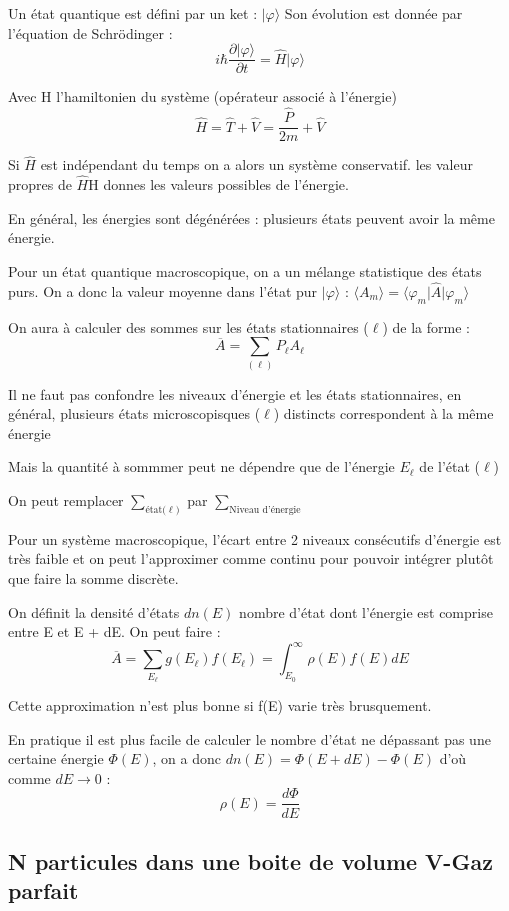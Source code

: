 \documentclass[12pt,a4paper]{report}
\begin{document}
Un état quantique est défini par un ket : \(\vert \varphi \rangle\)
Son évolution est donnée par l'équation de Schrödinger :
\[
	i\hbar \dfrac{\partial \vert \varphi \rangle}{\partial t} = \hat{H} \vert \varphi \rangle
\]

Avec H l'hamiltonien du système (opérateur associé à l'énergie)
\[
	\hat{H} = \hat{T} + \hat{V} = \dfrac{\hat{P}}{2m} + \hat{V}
\]

Si \(\hat{H}\) est indépendant du temps on a alors un système conservatif. les valeur propres de \(\hat{H}\)H donnes les valeurs possibles de l'énergie.

En général, les énergies sont dégénérées : plusieurs états peuvent avoir la même énergie.

Pour un état quantique macroscopique, on a un mélange statistique des états purs.
On a donc la valeur moyenne dans l'état pur \(\vert \varphi \rangle\) : \(\langle A_m \rangle = \langle \varphi_m \vert \hat{A} \vert \varphi_m \rangle\)

On aura à calculer des sommes sur les états stationnaires (\(\ell\)) de la forme :
\[
	\overline{A} = \sum_{(\ell)} P_{\ell} A_{\ell}
\]

Il ne faut pas confondre les niveaux d'énergie et les états stationnaires, en général, plusieurs états microscopisques (\(\ell\)) distincts correspondent à la même énergie

Mais la quantité à sommmer peut ne dépendre que de l'énergie \(E_\ell\) de l'état (\(\ell\))

On peut remplacer \(\sum_{\text{état(}\ell)}\) par \(\sum_{\text{Niveau d'énergie}}\)

Pour un système macroscopique, l'écart entre 2 niveaux consécutifs d'énergie est très faible et on peut l'approximer comme continu pour pouvoir intégrer plutôt que faire la somme discrète.

On définit la densité d'états \(dn(E)\) nombre d'état dont l'énergie est comprise entre E et E + dE.
On peut faire :
\[
	\overline{A} = \sum_{E_\ell} g(E_\ell)f(E_\ell) = \int_{E_0}^{\infty} \rho(E)f(E) dE
\]

Cette approximation n'est plus bonne si f(E) varie très brusquement.

En pratique il est plus facile de calculer le nombre d'état ne dépassant pas une certaine énergie \(\Phi(E)\), on a donc \(dn(E) = \Phi(E+dE) - \Phi(E)\) d'où comme \(dE \rightarrow 0\) : 
\[
	\rho(E) = \dfrac{d\Phi}{dE}
\]

\subsection{N particules dans une boite de volume V-Gaz parfait}
\end{document}
